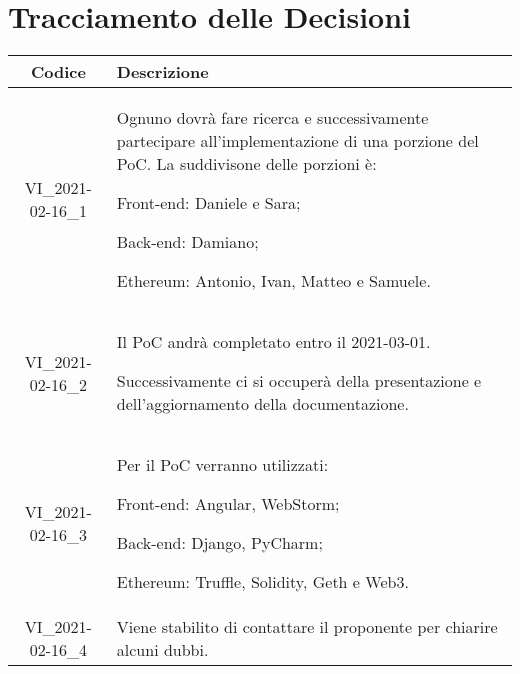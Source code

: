 \section*{Tracciamento delle Decisioni}

\begin{center}
	\begin{longtable}{|c|p{13cm}|}
	\hline
	\rowcolor{lighter-grayer}
	\textbf{Codice} & \textbf{Descrizione} \\
	\hline
	\endfirsthead

	\hline
	VI\_2021-02-16\_1 & Ognuno dovrà fare ricerca e successivamente partecipare all'implementazione di una porzione del PoC.
	La suddivisone delle porzioni è:
	
	Front-end:
	Daniele e Sara;
	
	Back-end:
	Damiano;
	
	Ethereum:
	Antonio, Ivan, Matteo e Samuele. \\
	\hline
	VI\_2021-02-16\_2 & Il PoC andrà completato entro il 2021-03-01.
	
	Successivamente ci si occuperà della presentazione e dell'aggiornamento della documentazione. \\
	\hline
	VI\_2021-02-16\_3 & Per il PoC verranno utilizzati:
	
	Front-end:
	Angular,
	WebStorm;
	
	Back-end:
	Django,
	PyCharm;
	
	Ethereum:
	Truffle, Solidity, Geth e Web3. \\
	\hline
	VI\_2021-02-16\_4 & Viene stabilito di contattare il proponente per chiarire alcuni dubbi. \\
	\hline

	

	\end{longtable}
\end{center}